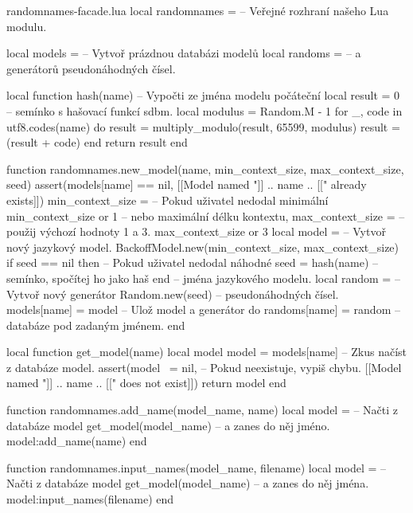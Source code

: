 \documentclass{csbulletin}
\begin{document}
\begin{filecontents}{randomnames-facade.lua}
local randomnames = {}      -- Veřejné rozhraní našeho Lua modulu.

local models = {}           -- Vytvoř prázdnou databázi modelů
local randoms = {}          -- a generátorů pseudonáhodných čísel.

local function hash(name)   -- Vypočti ze jména modelu počáteční
  local result = 0          -- semínko s hašovací funkcí sdbm.
  local modulus = Random.M - 1
  for _, code in utf8.codes(name) do
    result = multiply_modulo(result, 65599, modulus)
    result = (result + code) %
  end
  return result
end

function randomnames.new_model(name, min_context_size,
                               max_context_size, seed)
  assert(models[name] == nil,
         [[Model named "]] .. name .. [[" already exists]])
  min_context_size =        -- Pokud uživatel nedodal minimální
    min_context_size or 1   -- nebo maximální délku kontextu,
  max_context_size =        -- použij výchozí hodnoty 1 a 3.
    max_context_size or 3
  local model =             -- Vytvoř nový jazykový model.
    BackoffModel.new(min_context_size, max_context_size)
  if seed == nil then       -- Pokud uživatel nedodal náhodné
    seed = hash(name)       -- semínko, spočítej ho jako haš
  end                       -- jména jazykového modelu.
  local random =            -- Vytvoř nový generátor
    Random.new(seed)        -- pseudonáhodných čísel.
  models[name] = model      -- Ulož model a generátor do
  randoms[name] = random    -- databáze pod zadaným jménem.
end

local function get_model(name)
  local model
  model = models[name]      -- Zkus načíst z databáze model.
  assert(model ~= nil,      -- Pokud neexistuje, vypiš chybu.
         [[Model named "]] .. name .. [[" does not exist]])
  return model
end

function randomnames.add_name(model_name, name)
  local model =             -- Načti z databáze model
    get_model(model_name)   -- a zanes do něj jméno.
  model:add_name(name)
end

function randomnames.input_names(model_name, filename)
  local model =             -- Načti z databáze model
    get_model(model_name)   -- a zanes do něj jména.
  model:input_names(filename)
end


\end{filecontents}
\end{document}
